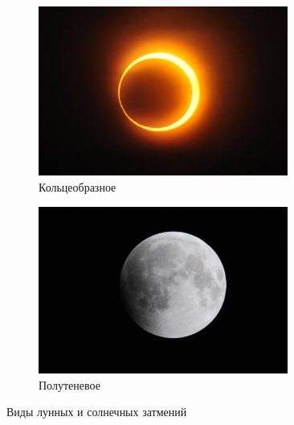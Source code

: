 \documentclass{article}
\begin{document}
\begin{figure}
    	\begin{subfigure}[b]{0.45\textwidth}
    		\includegraphics[width = 0.9\textwidth]{img/AnnularEclipse}
    		\caption{Кольцеобразное}
    	\end{subfigure}
    	\begin{subfigure}[b]{0.45\textwidth}
        	\includegraphics[width = 0.9\textwidth]{img/PenumbralEclipse}
    		\caption{Полутеневое}
    	\end{subfigure}
    	\caption{Виды лунных и солнечных затмений}
    \end{figure}




    
\end{document}
